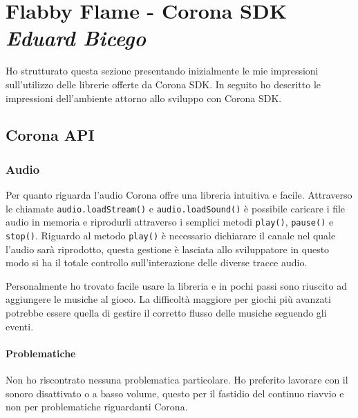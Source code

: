 \newpage
\section{Flabby Flame - Corona SDK\\ {\small \emph{Eduard Bicego}}}
\label{sec:corona}

	Ho strutturato questa sezione presentando inizialmente le mie impressioni sull'utilizzo delle librerie offerte da Corona SDK. In seguito ho descritto le impressioni dell'ambiente attorno allo sviluppo con Corona SDK.
	
	\subsection{Corona API}

	\subsubsection{Audio}
		Per quanto riguarda l'audio Corona offre una libreria intuitiva e facile. Attraverso le chiamate \verb|audio.loadStream()| e \verb|audio.loadSound()| è possibile caricare i file audio in memoria e riprodurli attraverso i semplici metodi \verb|play()|, \verb|pause()| e \verb|stop()|. Riguardo al metodo \verb|play()| è necessario dichiarare il canale nel quale l'audio sarà riprodotto, questa gestione è lasciata allo sviluppatore in questo modo si ha il totale controllo sull'interazione delle diverse tracce audio.
		
		Personalmente ho trovato facile usare la libreria e in pochi passi sono riuscito ad aggiungere le musiche al gioco. La difficoltà maggiore per giochi più avanzati potrebbe essere quella di gestire il corretto flusso delle musiche seguendo gli eventi.
		
		
		\paragraph{Problematiche}
			Non ho riscontrato nessuna problematica particolare. Ho preferito lavorare con il sonoro disattivato o a basso volume, questo per il fastidio del continuo riavvio e non per problematiche riguardanti Corona.
	
